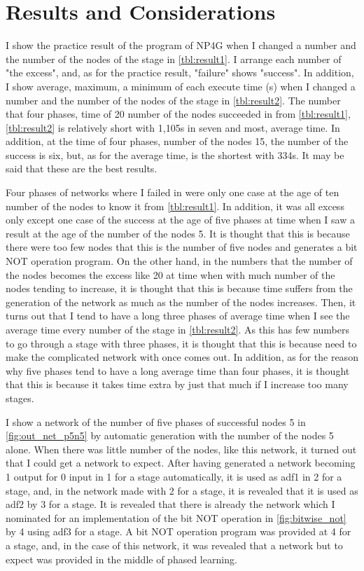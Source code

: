 \documentclass{article}
\begin{document}
\section {Results and Considerations}
I show the practice result of the program of NP4G when I changed a number and the number of the nodes of the stage in \ref{tbl:result1}.
I arrange each number of "the excess", and, as for the practice result, "failure" shows "success".
In addition, I show average, maximum, a minimum of each execute time (s) when I changed a number and the number of the nodes of the stage in \ref{tbl:result2}.
The number that four phases, time of 20 number of the nodes succeeded in from \ref{tbl:result1}, \ref{tbl:result2} is relatively short with 1,105s in seven and most, average time.
In addition, at the time of four phases, number of the nodes 15, the number of the success is six, but, as for the average time, is the shortest with 334s.
It may be said that these are the best results.

Four phases of networks where I failed in were only one case at the age of ten number of the nodes to know it from \ref{tbl:result1}.
In addition, it was all excess only except one case of the success at the age of five phases at time when I saw a result at the age of the number of the nodes 5.
It is thought that this is because there were too few nodes that this is the number of five nodes and generates a bit NOT operation program.
On the other hand, in the numbers that the number of the nodes becomes the excess like 20 at time when with much number of the nodes tending to increase, it is thought that this is because time suffers from the generation of the network as much as the number of the nodes increases.
Then, it turns out that I tend to have a long three phases of average time when I see the average time every number of the stage in \ref{tbl:result2}.
As this has few numbers to go through a stage with three phases, it is thought that this is because need to make the complicated network with once comes out.
In addition, as for the reason why five phases tend to have a long average time than four phases, it is thought that this is because it takes time extra by just that much if I increase too many stages.

I show a network of the number of five phases of successful nodes 5 in \ref{fig:out_net_p5n5} by automatic generation with the number of the nodes 5 alone.
When there was little number of the nodes, like this network, it turned out that I could get a network to expect.
After having generated a network becoming 1 output for 0 input in 1 for a stage automatically, it is used as adf1 in 2 for a stage, and, in the network made with 2 for a stage, it is revealed that it is used as adf2 by 3 for a stage.
It is revealed that there is already the network which I nominated for an implementation of the bit NOT operation in \ref{fig:bitwise_not} by 4 using adf3 for a stage.
A bit NOT operation program was provided at 4 for a stage, and, in the case of this network, it was revealed that a network but to expect was provided in the middle of phased learning.
\end{document}
